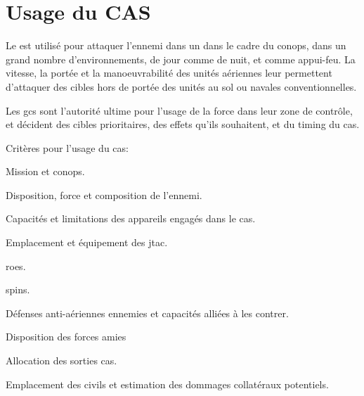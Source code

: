\section{Usage du CAS}

Le  est utilisé pour attaquer l'ennemi dans un dans le cadre du \gls{conops}, dans un grand nombre d'environnements, de jour comme de nuit, et comme appui-feu. La vitesse, la portée et la manoeuvrabilité des unités aériennes leur permettent d'attaquer des cibles hors de portée des unités au sol ou navales conventionnelles.

Les \glspl{gc} sont l'autorité ultime pour l'usage de la force dans leur zone de contrôle, et décident des cibles prioritaires, des effets qu'ils souhaitent, et du timing du \gls{cas}.

\begin{e1}
	
	
	\item Critères pour l'usage du \gls{cas}:
	
	\begin{e2}
		\item Mission et \gls{conops}.
		\item Disposition, force et composition de l'ennemi.
		\item Capacités et limitations des appareils engagés dans le \gls{cas}.
		\item Emplacement et équipement des \gls{jtac}.
		\item \glspl{roe}.
		\item \gls{spins}.
		\item Défenses anti-aériennes ennemies et capacités alliées à les contrer.
		\item Disposition des forces amies
		\item Allocation des sorties \gls{cas}.
		\item Emplacement des civils et estimation des dommages collatéraux potentiels.	
	\end{e2}
	

\end{e1}
